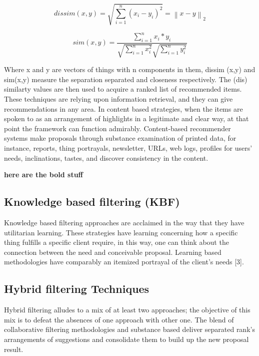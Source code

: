 \documentclass[10pt,conference]{IEEEtran}
\begin{document}
\begin{equation}
dissim(x, y) = \sqrt{\sum_{i=1}^{n}\left ( x_{i} - y_{i} \right )^{2}} = \left \| x - y \right \|_2
\label{dissimilarity} \tag{3}
\end{equation}


\begin{equation}
sim(x,y) = \frac{\sum_{i=1}^{n} x_{i} \ast y_{i}}{\sqrt{\sum_{i=1}^{n} x_{i}^{2}} \sqrt{\sum_{i=1}^{n} y_{i}^{2}}}
\label{eq:similarity} \tag{4}
\end{equation}

Where x and y are vectors of things with n components in them, dissim (x,y) and sim(x,y) measure the separation separated and closeness respectively. The (dis) similarty values are then used to acquire a ranked list of recommended items. These techniques are relying upon information retrieval, and they can give recommendations in any area. In content based strategies, when the items are spoken to as an arrangement of highlights in a legitimate and clear way, at that point the framework can function admirably. Content-based recommender systems make proposals through substance examination of printed data, for instance, reports, thing portrayals, newsletter, URLs, web logs, profiles for users' needs, inclinations, tastes, and discover consistency in the content.

\textbf{here are the bold stuff}

\subsection{Knowledge based filtering (KBF)}
Knowledge based filtering approaches are acclaimed in the way that they have utilitarian learning. These strategies have learning concerning how a specific thing fulfills a specific client require, in this way, one can think about the connection between the need and conceivable proposal. Learning based methodologies have comparably an itemized portrayal of the client's needs [3].


\subsection{Hybrid filtering Techniques}
Hybrid filtering alludes to a mix of at least two approaches; the objective of this mix is to defeat the absences of one approach with other one. The blend of collaborative filtering methodologies and substance based deliver separated rank's arrangements of suggestions and consolidate them to build up the new proposal result.
\end{document}
